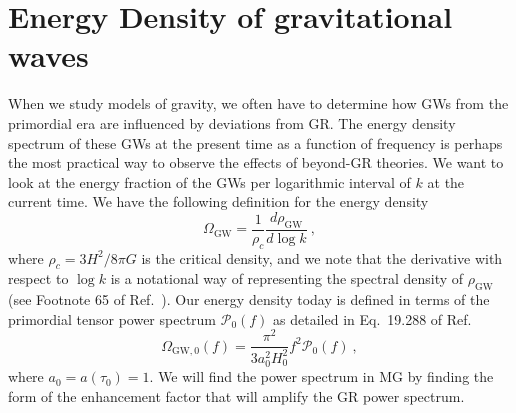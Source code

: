 \documentclass[prd,twocolumn,aps,psfig,nofootinbib,nobibnotes,superscriptaddress,preprintnumbers,times]{revtex4-2}
\begin{document}
\section{Energy Density of gravitational waves}\label{sec:energy}
When we study models of gravity, we often have to determine how GWs from the primordial era are influenced by deviations from GR. The energy density spectrum of these GWs at the present time as a function of frequency is perhaps the most practical way to observe the effects of beyond-GR theories. We want to look at the energy fraction of the GWs per logarithmic interval of $k$ at the current time. We have the following definition for the energy density 
\begin{equation}\label{eqn:omega_sfm}
    \Omega_\text{GW} = \frac{1}{\rho_c}\frac{d \rho_\text{GW}} {d \log{k}} \ ,
\end{equation}
where $\rho_c = 3H^2/8\pi G$ is the critical density, and we note that the derivative with respect to $\log k$ is a notational way of representing the spectral density of $\rho_\text{GW}$ (see Footnote 65 of Ref.\ \cite{Maggiore:v1}). Our energy density today is defined in terms of the primordial tensor power spectrum $\mathcal{P}_0(f)$ as detailed in Eq.\ 19.288 of Ref.\ \cite{Maggiore:v2}
\begin{equation}\label{eqn:omega_0_sfm}
    \Omega_{\text{GW},0}(f) = \frac{\pi^2}{3a_0^2H_0^2}f^2 \mathcal{P}_0(f) \ , 
\end{equation}
where $a_0 = a(\tau_0) = 1$. We will find the power spectrum in MG by finding the form of the enhancement factor that will amplify the GR power spectrum.  
\end{document}
